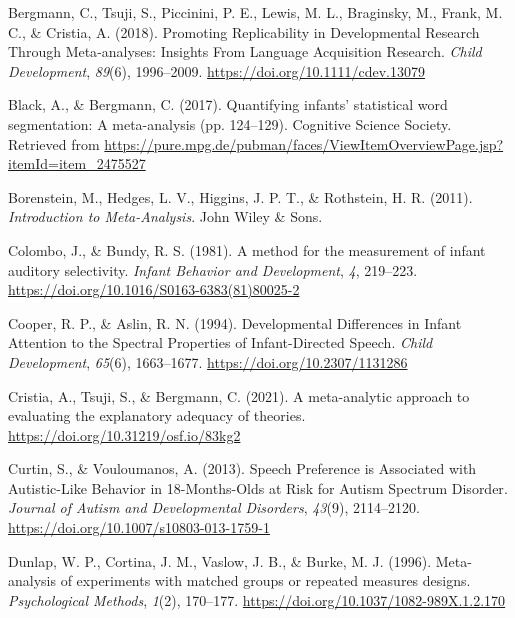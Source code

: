 \documentclass[
  english,
  man]{apa6}
\newlength{\cslhangindent}
\newlength{\cslentryspacingunit} %
\newenvironment{CSLReferences}[2] %
 {%
  \setlength{\parindent}{0pt}
  \ifodd #1
  \let\oldpar\par
  \def\par{\hangindent=\cslhangindent\oldpar}
  \fi
  \setlength{\parskip}{#2\cslentryspacingunit}
 }%
 {}
\begin{document}
\hypertarget{refs}{}
\begin{CSLReferences}{1}{0}
\leavevmode{}%
Bergmann, C., Tsuji, S., Piccinini, P. E., Lewis, M. L., Braginsky, M., Frank, M. C., \& Cristia, A. (2018). Promoting {Replicability} in {Developmental} {Research} {Through} {Meta}-analyses: {Insights} {From} {Language} {Acquisition} {Research}. \emph{Child Development}, \emph{89}(6), 1996--2009. \url{https://doi.org/10.1111/cdev.13079}

\leavevmode{}%
Black, A., \& Bergmann, C. (2017). Quantifying infants' statistical word segmentation: {A} meta-analysis (pp. 124--129). Cognitive Science Society. Retrieved from \url{https://pure.mpg.de/pubman/faces/ViewItemOverviewPage.jsp?itemId=item_2475527}

\leavevmode{}%
Borenstein, M., Hedges, L. V., Higgins, J. P. T., \& Rothstein, H. R. (2011). \emph{Introduction to {Meta}-{Analysis}}. John Wiley \& Sons.

\leavevmode{}%
Colombo, J., \& Bundy, R. S. (1981). A method for the measurement of infant auditory selectivity. \emph{Infant Behavior and Development}, \emph{4}, 219--223. \url{https://doi.org/10.1016/S0163-6383(81)80025-2}

\leavevmode{}%
Cooper, R. P., \& Aslin, R. N. (1994). Developmental {Differences} in {Infant} {Attention} to the {Spectral} {Properties} of {Infant}-{Directed} {Speech}. \emph{Child Development}, \emph{65}(6), 1663--1677. \url{https://doi.org/10.2307/1131286}

\leavevmode{}%
Cristia, A., Tsuji, S., \& Bergmann, C. (2021). A meta-analytic approach to evaluating the explanatory adequacy of theories. \url{https://doi.org/10.31219/osf.io/83kg2}

\leavevmode{}%
Curtin, S., \& Vouloumanos, A. (2013). Speech {Preference} is {Associated} with {Autistic}-{Like} {Behavior} in 18-{Months}-{Olds} at {Risk} for {Autism} {Spectrum} {Disorder}. \emph{Journal of Autism and Developmental Disorders}, \emph{43}(9), 2114--2120. \url{https://doi.org/10.1007/s10803-013-1759-1}

\leavevmode{}%
Dunlap, W. P., Cortina, J. M., Vaslow, J. B., \& Burke, M. J. (1996). Meta-analysis of experiments with matched groups or repeated measures designs. \emph{Psychological Methods}, \emph{1}(2), 170--177. \url{https://doi.org/10.1037/1082-989X.1.2.170}


\end{CSLReferences}
\end{document}
